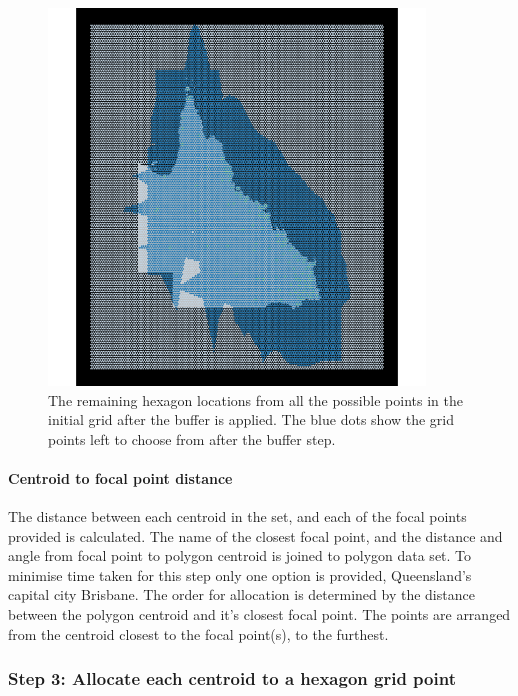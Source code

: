 \documentclass{monashthesis}
\begin{document}
\begin{figure}[H]
\centering
\includegraphics[width=10cm]{figures/03-algorithm/3grid.pdf}
\caption{\label{fig:filter-grid}The remaining hexagon locations from all the possible points in the initial grid after the buffer is applied. The blue dots show the grid points left to choose from after the buffer step.}
\end{figure}

\hypertarget{centroid-to-focal-point-distance}{%
\paragraph{Centroid to focal point distance}\label{centroid-to-focal-point-distance}}

The distance between each centroid in the set, and each of the focal points provided is calculated. The name of the closest focal point, and the distance and angle from focal point to polygon centroid is joined to polygon data set. To minimise time taken for this step only one option is provided, Queensland's capital city Brisbane.
The order for allocation is determined by the distance between the polygon centroid and it's closest focal point. The points are arranged from the centroid closest to the focal point(s), to the furthest.

\hypertarget{step-3-allocate-each-centroid-to-a-hexagon-grid-point}{%
\subsubsection{Step 3: Allocate each centroid to a hexagon grid point}\label{step-3-allocate-each-centroid-to-a-hexagon-grid-point}}
\end{document}
